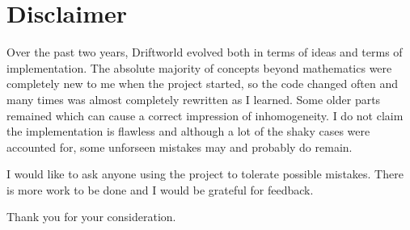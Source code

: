 \section*{Disclaimer}

Over the past two years, Driftworld evolved both in terms of ideas and terms of implementation. The absolute majority of concepts beyond mathematics were completely new to me when the project started, so the code changed often and many times was almost completely rewritten as I learned. Some older parts remained which can cause a correct impression of inhomogeneity. I do not claim the implementation is flawless and although a lot of the shaky cases were accounted for, some unforseen mistakes may and probably do remain.

I would like to ask anyone using the project to tolerate possible mistakes. There is more work to be done and I would be grateful for feedback.

Thank you for your consideration.